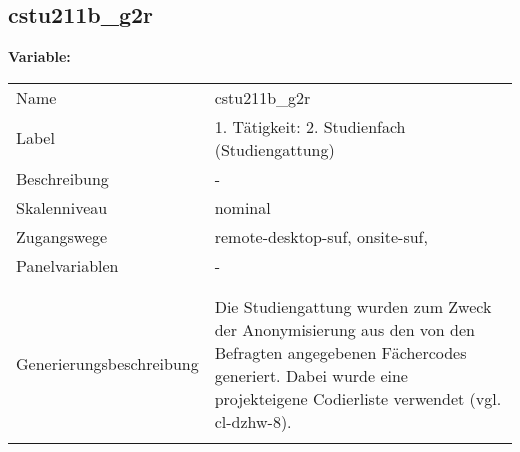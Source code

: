 	
	
	\subsection{cstu211b\_g2r}
	\label{subSection:cstu211b_g2r}

	\noindent\textbf{Variable:}\\
		\begin{tabular}{lL{11.3cm}}
			\label{tableVariable:cstu211b_g2r}
			Name & cstu211b\_g2r \\
			Label & 1. Tätigkeit: 2. Studienfach (Studiengattung) \\
			Beschreibung & - \\
			Skalenniveau & nominal \\
			Zugangswege &
				remote-desktop-suf,
				onsite-suf,
 \\
			Panelvariablen & -
			 \\
			 \\
 \\
					Generierungsbeschreibung & Die Studiengattung wurden zum Zweck der Anonymisierung aus den von den Befragten angegebenen Fächercodes generiert.  Dabei wurde eine projekteigene Codierliste verwendet (vgl. cl-dzhw-8).
				 \\	
			 \\
		\end{tabular}






